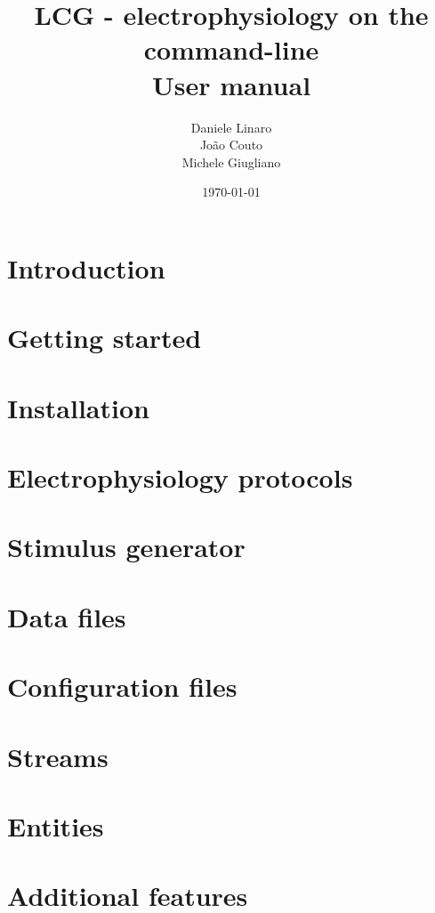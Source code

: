 \documentclass[10pt,a4paper,twoside]{book}
\title{\textbf{LCG} - electrophysiology on the command-line \\ User manual}
\author{Daniele Linaro \\ Jo\~ao Couto \\ Michele Giugliano}
\date{\today}
\begin{document}
\maketitle
\thispagestyle{empty}

\tableofcontents
\newpage
{}

\chapter{Introduction}
\label{chap:intro}


\chapter{Getting started}
\label{chap:start}


\chapter{Installation}
\label{chap:installation}


\chapter{Electrophysiology protocols}
\label{chap:protocols}



\chapter{Stimulus generator}
\label{chap:stimgen}


\chapter{Data files}
\label{chap:datafiles}


\chapter{Configuration files}
\label{chap:configuration}


\chapter{Streams}
\label{chap:streams}


\chapter{Entities}
\label{chap:entities}


\chapter{Additional features}
\label{chap:features}





%

%
%
\end{document}
